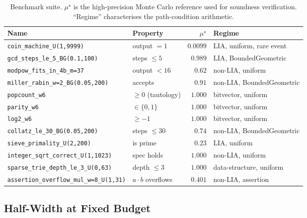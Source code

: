 \documentclass[runningheads]{llncs}
\newcommand{\mutrue}{\mu}
\newcommand{\code}[1]{\texttt{#1}}
\begin{document}
\begin{table}[t]
  \centering
  \caption{Benchmark suite.  $\mutrue^\star$ is the high-precision
    Monte Carlo reference used for soundness verification.  ``Regime''
    characterises the path-condition arithmetic.}
  \label{tab:benchmarks}
  \begin{tabular}{llrl}
    \toprule
    Name & Property & $\mutrue^\star$ & Regime \\
    \midrule
    \code{coin\_machine\_U(1,9999)}
      & output $= 1$           & $0.0099$ & LIA, uniform, rare event \\
    \code{gcd\_steps\_le\_5\_BG(0.1,100)}
      & steps $\le 5$          & $0.989$  & LIA, BoundedGeometric \\
    \code{modpow\_fits\_in\_4b\_m=37}
      & output $< 16$          & $0.62$   & non-LIA, uniform \\
    \code{miller\_rabin\_w=2\_BG(0.05,200)}
      & accepts                & $0.91$   & non-LIA, BoundedGeometric \\
    \code{popcount\_w6}
      & $\ge 0$ (tautology)    & $1.000$  & bitvector, uniform \\
    \code{parity\_w6}
      & $\in \{0,1\}$          & $1.000$  & bitvector, uniform \\
    \code{log2\_w6}
      & $\ge -1$               & $1.000$  & bitvector, uniform \\
    \code{collatz\_le\_30\_BG(0.05,200)}
      & steps $\le 30$         & $0.74$   & non-LIA, BoundedGeometric \\
    \code{sieve\_primality\_U(2,200)}
      & is prime               & $0.23$   & LIA, uniform \\
    \code{integer\_sqrt\_correct\_U(1,1023)}
      & spec holds             & $1.000$  & non-LIA, uniform \\
    \code{sparse\_trie\_depth\_le\_3\_U(0,63)}
      & depth $\le 3$          & $1.000$  & data-structure, uniform \\
    \code{assertion\_overflow\_mul\_w=8\_U(1,31)}
      & $a \cdot b$ overflows  & $0.401$  & non-LIA, assertion \\
    \bottomrule
  \end{tabular}
\end{table}

\subsection{Half-Width at Fixed Budget}\label{sec:fixed-budget}
\end{document}
